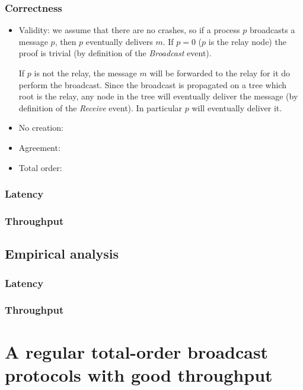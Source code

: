 \documentclass[a4paper]{article}
\begin{document}
\subsubsection*{Correctness}
\begin{itemize}
    \item Validity: we assume that there are no crashes, so if a process $p$
	broadcasts a message $p$, then $p$ eventually delivers $m$. If $p = 0$
	($p$ is the relay node) the proof is trivial (by definition of the
	\textit{Broadcast} event).

	If $p$ is not the relay, the message $m$ will be forwarded to the
	relay for it do perform the broadcast. Since the broadcast is
	propagated on a tree which root is the relay, any node in the tree
	will eventually deliver the message (by definition of the
	\textit{Receive} event). In particular $p$ will eventually deliver it.
    \item No creation:
    \item Agreement:
    \item Total order:
\end{itemize}


\subsubsection*{Latency}

\subsubsection*{Throughput}

\subsection{Empirical analysis}

\subsubsection*{Latency}

\subsubsection*{Throughput}

\section{A regular total-order broadcast protocols with good throughput}
\label{sec:throughputTO}
\end{document}
